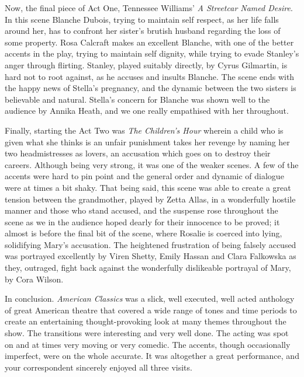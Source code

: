 Now, the final piece of Act One, Tennessee Williams' \textit{A Streetcar
Named Desire}. In this scene Blanche Dubois, trying to maintain self
respect, as her life falls around her, has to confront her sister's
brutish husband regarding the loss of some property. Rosa Calcraft makes
an excellent Blanche, with one of the better accents in the play, trying
to maintain self dignity, while trying to evade Stanley's anger through
flirting. Stanley, played suitably directly, by Cyrus Gilmartin, is hard
not to root against, as he accuses and insults Blanche. The scene ends
with the happy news of Stella's pregnancy, and the dynamic between the
two sisters is believable and natural. Stella's concern for Blanche was
shown well to the audience by Annika Heath, and we one really empathised
with her throughout.

Finally, starting the Act Two was \textit{The Children's Hour} wherein a
child who is given what she thinks is an unfair punishment takes her
revenge by naming her two headmistresses as lovers, an accusation which
goes on to destroy their careers. Although being very strong, it was one
of the weaker scenes. A few of the accents were hard to pin point and
the general order and dynamic of dialogue were at times a bit shaky.
That being said, this scene was able to create a great tension between
the grandmother, played by Zetta Allas, in a wonderfully hostile manner
and those who stand accused, and the suspense rose throughout the scene
as we in the audience hoped dearly for their innocence to be proved; it
almost is before the final bit of the scene, where Rosalie is coerced
into lying, solidifying Mary's accusation. The heightened frustration of
being falsely accused was portrayed excellently by Viren Shetty, Emily
Hassan and Clara Falkowska as they, outraged, fight back against the
wonderfully dislikeable portrayal of Mary, by Cora Wilson.

In conclusion. \textit{American Classics} was a slick, well executed, well
acted anthology of great American theatre that covered a wide range of
tones and time periods to create an entertaining thought-provoking look
at many themes throughout the show. The transitions were interesting and
very well done. The acting was spot on and at times very moving or very
comedic. The accents, though occasionally imperfect, were on the whole
accurate. It was altogether a great performance, and your correspondent
sincerely enjoyed all three visits.
